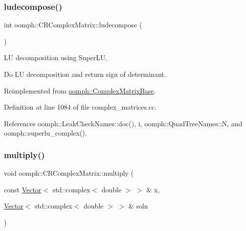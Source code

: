 \mbox{\label{classoomph_1_1CRComplexMatrix_a8f2e601ccd4bb7c74af3c55cf6c3290b}} 
\subsubsection{\texorpdfstring{ludecompose()}{ludecompose()}}
{\footnotesize\ttfamily int oomph\+::\+C\+R\+Complex\+Matrix\+::ludecompose (\begin{DoxyParamCaption}{ }\end{DoxyParamCaption})\hspace{0.3cm}{\ttfamily [virtual]}}



LU decomposition using Super\+LU. 

Do LU decomposition and return sign of determinant. 

Reimplemented from \hyperlink{classoomph_1_1ComplexMatrixBase_a11e1beeb7767e9bc5e511c17f80f097f}{oomph\+::\+Complex\+Matrix\+Base}.



Definition at line 1084 of file complex\+\_\+matrices.\+cc.



References oomph\+::\+Leak\+Check\+Names\+::doc(), i, oomph\+::\+Quad\+Tree\+Names\+::N, and oomph\+::superlu\+\_\+complex().

\mbox{\label{classoomph_1_1CRComplexMatrix_a5ebf5f24c1bd1b4e4e3df6ebcceb189e}} 
\subsubsection{\texorpdfstring{multiply()}{multiply()}}
{\footnotesize\ttfamily void oomph\+::\+C\+R\+Complex\+Matrix\+::multiply (\begin{DoxyParamCaption}\item[{const \hyperlink{classoomph_1_1Vector}{Vector}$<$ std\+::complex$<$ double $>$ $>$ \&}]{x,  }\item[{\hyperlink{classoomph_1_1Vector}{Vector}$<$ std\+::complex$<$ double $>$ $>$ \&}]{soln }\end{DoxyParamCaption})\hspace{0.3cm}{\ttfamily [virtual]}}



